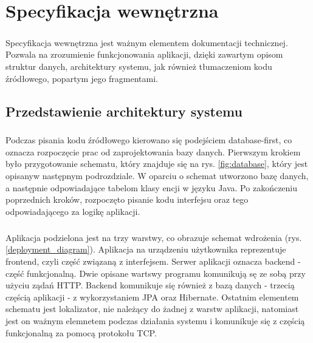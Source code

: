 \chapter{Specyfikacja wewnętrzna}
\label{ch:05}

\paragraph{}
Specyfikacja wewnętrzna jest ważnym elementem dokumentacji technicznej. Pozwala na zrozumienie funkcjonowania aplikacji, dzięki zawartym opisom struktur danych, architektury systemu, jak również tłumaczeniom kodu źródłowego, popartym jego fragmentami.

\section{Przedstawienie architektury systemu}
\paragraph{}
Podczas pisania kodu źródłowego kierowano się podejściem database-first, co oznacza rozpoczęcie prac od zaprojektowania bazy danych. Pierwszym krokiem było przygotowanie schematu, który znajduje się na rys. \ref{fig:database}, który jest opisanyw następnym podrozdziale. W oparciu o schemat utworzono bazę danych, a następnie odpowiadające tabelom klasy encji w języku Java. Po zakończeniu poprzednich kroków, rozpoczęto pisanie kodu interfejsu oraz tego odpowiadającego za logikę aplikacji. 

\paragraph{}
Aplikacja podzielona jest na trzy warstwy, co obrazuje schemat wdrożenia (rys. \ref{deployment_diagram}). Aplikacja na urządzeniu użytkownika reprezentuje frontend, czyli część związaną z interfejsem. Serwer aplikacji oznacza backend - część funkcjonalną. Dwie opisane wartswy programu komunikują sę ze sobą przy użyciu ządań HTTP. Backend komunikuje się również z bazą danych - trzecią częścią aplikacji - z wykorzystaniem JPA oraz Hibernate. Ostatnim elementem schematu jest lokalizator, nie należący do żadnej z warstw aplikacji, natomiast jest on ważnym elemnetem podczas działania systemu i komunikuje się z częścią funkcjonalną za pomocą protokołu TCP.


